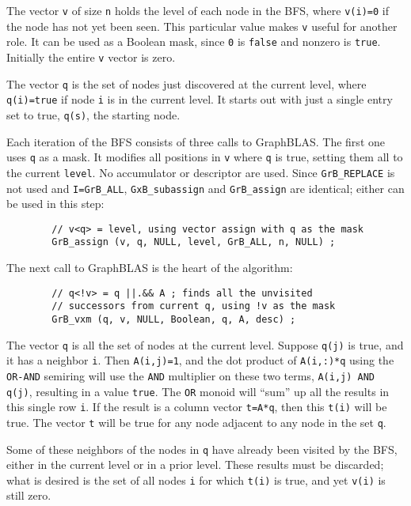 \documentclass[12pt]{article}
\begin{document}
The vector \verb'v' of size \verb'n' holds the level of each node in the
BFS, where \verb'v(i)=0' if the node has not yet been seen.  This particular
value makes \verb'v' useful for another role.  It can be used as a Boolean
mask, since \verb'0' is \verb'false' and nonzero is \verb'true'.
Initially the entire \verb'v' vector is zero.

The vector \verb'q' is the set of nodes just discovered at the current level,
where \verb'q(i)=true' if node \verb'i' is in the current level.  It starts out
with just a single entry set to true, \verb'q(s)', the starting node.

Each iteration of the BFS consists of three calls to GraphBLAS.  The first one
uses \verb'q' as a mask.  It modifies all positions in \verb'v' where \verb'q'
is true, setting them all to the current \verb'level'.  No accumulator or
descriptor are used.  Since \verb'GrB_REPLACE' is not used and
\verb'I=GrB_ALL', \verb'GxB_subassign' and \verb'GrB_assign' are identical;
either can be used in this step:

        {\footnotesize
        \begin{verbatim}
        // v<q> = level, using vector assign with q as the mask
        GrB_assign (v, q, NULL, level, GrB_ALL, n, NULL) ; \end{verbatim}}

The next call to GraphBLAS is the heart of the algorithm:

        {\footnotesize
        \begin{verbatim}
        // q<!v> = q ||.&& A ; finds all the unvisited
        // successors from current q, using !v as the mask
        GrB_vxm (q, v, NULL, Boolean, q, A, desc) ; \end{verbatim}}

The vector \verb'q' is all the set of nodes at the current level.  Suppose
\verb'q(j)' is true, and it has a neighbor \verb'i'.  Then \verb'A(i,j)=1', and
the dot product of \verb'A(i,:)*q' using the \verb'OR-AND' semiring will use
the \verb'AND' multiplier on these two terms, \verb'A(i,j) AND q(j)', resulting
in a value \verb'true'.  The \verb'OR' monoid will ``sum'' up all the results
in this single row \verb'i'.  If the result is a column vector \verb't=A*q',
then this \verb't(i)' will be true.  The vector \verb't' will be true for
any node adjacent to any node in the set \verb'q'.

Some of these neighbors of the nodes in \verb'q' have already been visited by
the BFS, either in the current level or in a prior level.  These results must
be discarded; what is desired is the set of all nodes \verb'i' for which
\verb't(i)' is true, and yet \verb'v(i)' is still zero.
\end{document}
